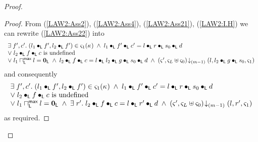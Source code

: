 \begin{lemma}[]
\begin{proof}
\begin{proof}
From (\ref{LAW2:Ass2}), (\ref{LAW2:Ass4}), (\ref{LAW2:Ass21}), (\ref{LAW2:I.H}) we can rewrite (\ref{LAW2:Ass22}) into
%
\begin{align}
	\begin{array}{l}
  	\exists\; f', c'.\; (l_1 \bullet_{\textsf{L}} f', l_2 \bullet_{\textsf{L}} f') \in \varsigma_{1}(\kappa_{}) \;\land\; l_1 \bullet_{\textsf{L}} f' \bullet_{\textsf{L}} c' =  l \bullet_{\textsf{L}} r \bullet_{\textsf{L}} s_0 \bullet_{\textsf{L}} d\\
		\lor\;l_2 \bullet_{\textsf{L}} f \bullet_{\textsf{L}} c \text{ is undefined}\\
		\lor\; l_1 \sqcap_{\textsf{L}}^{\textsf{max}} l = \mathbf{0}_{\textsf{L}} \;\land\; l_2 \bullet_{\textsf{L}} f \bullet_{\textsf{L}} c = l \bullet_{\textsf{L}} l_2 \bullet_{\textsf{L}} g \bullet_{\textsf{L}} s_0 \bullet_{\textsf{L}} d \;\land\; \left(\varsigma_{}', \varsigma_{L} \uplus \varsigma_{0}\right) \!\downarrow_{(m-1)} \left(l, l_2 \bullet_{\textsf{L}} g \bullet_{\textsf{L}} s_0, \varsigma_{1}\right)
	\end{array} \label{LAW2:Ass22}
\end{align}
and consequently 
%
\begin{align}
	\begin{array}{l}
  	\exists\; f', c'.\; (l_1 \bullet_{\textsf{L}} f', l_2 \bullet_{\textsf{L}} f') \in \varsigma_{1}(\kappa_{}) \;\land\; l_1 \bullet_{\textsf{L}} f' \bullet_{\textsf{L}} c' =  l \bullet_{\textsf{L}} r \bullet_{\textsf{L}} s_0 \bullet_{\textsf{L}} d\\
		\lor\;l_2 \bullet_{\textsf{L}} f \bullet_{\textsf{L}} c \text{ is undefined}\\
		\lor\; l_1 \sqcap_{\textsf{L}}^{\textsf{max}} l = \mathbf{0}_{\textsf{L}} \;\land\; \exists\; r'.\; l_2 \bullet_{\textsf{L}} f \bullet_{\textsf{L}} c = l \bullet_{\textsf{L}} r' \bullet_{\textsf{L}} d \;\land\; \left(\varsigma_{}', \varsigma_{L} \uplus \varsigma_{0}\right) \!\downarrow_{(m-1)} \left(l, r', \varsigma_{1}\right)
	\end{array} \label{LAW2:Ass22}
\end{align}
as required.
\renewcommand{\qed}{}
\end{proof}



\end{proof}
\end{lemma}
